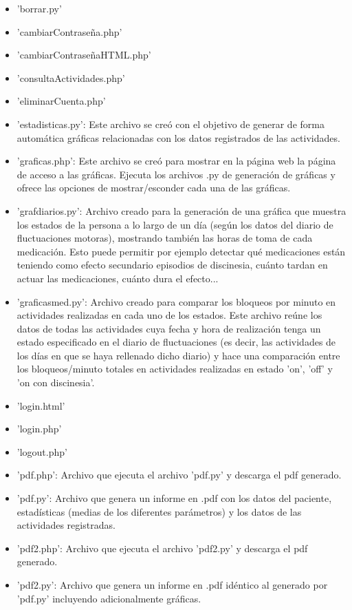 \begin{itemize}
\begin{itemize}
        \item 'borrar.py'
        \item 'cambiarContraseña.php'
        \item 'cambiarContraseñaHTML.php'
        \item 'consultaActividades.php'
        \item 'eliminarCuenta.php'
        \item 'estadisticas.py': Este archivo se creó con el objetivo de generar de forma automática gráficas relacionadas con los datos registrados de las actividades.
        \item 'graficas.php': Este archivo se creó para mostrar en la página web la página de acceso a las gráficas. Ejecuta los archivos .py de generación de gráficas y ofrece las opciones de mostrar/esconder cada una de las gráficas.
        \item 'grafdiarios.py': Archivo creado para la generación de una gráfica que muestra los estados de la persona a lo largo de un día (según los datos del diario de fluctuaciones motoras), mostrando también las horas de toma de cada medicación. Esto puede permitir por ejemplo detectar qué medicaciones están teniendo como efecto secundario episodios de discinesia, cuánto tardan en actuar las medicaciones, cuánto dura el efecto...
        \item 'graficasmed.py': Archivo creado para comparar los bloqueos por minuto en actividades realizadas en cada uno de los estados. Este archivo reúne los datos de todas las actividades cuya fecha y hora de realización tenga un estado especificado en el diario de fluctuaciones (es decir, las actividades de los días en que se haya rellenado dicho diario) y hace una comparación entre los bloqueos/minuto totales en actividades realizadas en estado 'on', 'off' y 'on con discinesia'.
        \item 'login.html'
        \item 'login.php'
        \item 'logout.php'
        \item 'pdf.php': Archivo que ejecuta el archivo 'pdf.py' y descarga el pdf generado.
        \item 'pdf.py': Archivo que genera un informe en .pdf con los datos del paciente, estadísticas (medias de los diferentes parámetros) y los datos de las actividades registradas.
        \item 'pdf2.php': Archivo que ejecuta el archivo 'pdf2.py' y descarga el pdf generado.
        \item 'pdf2.py': Archivo que genera un informe en .pdf idéntico al generado por 'pdf.py' incluyendo adicionalmente gráficas.

\end{itemize}
\end{itemize}
